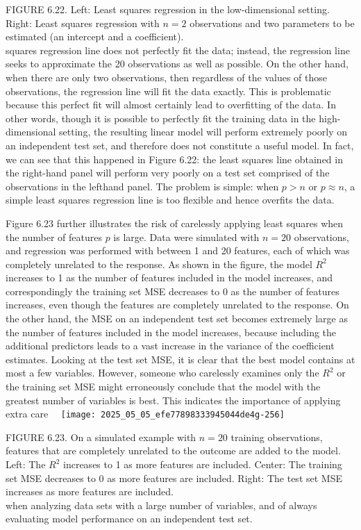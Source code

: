 \documentclass[10pt]{article}
\begin{document}
FIGURE 6.22. Left: Least squares regression in the low-dimensional setting. Right: Least squares regression with $n=2$ observations and two parameters to be estimated (an intercept and a coefficient).\\
squares regression line does not perfectly fit the data; instead, the regression line seeks to approximate the 20 observations as well as possible. On the other hand, when there are only two observations, then regardless of the values of those observations, the regression line will fit the data exactly. This is problematic because this perfect fit will almost certainly lead to overfitting of the data. In other words, though it is possible to perfectly fit the training data in the high-dimensional setting, the resulting linear model will perform extremely poorly on an independent test set, and therefore does not constitute a useful model. In fact, we can see that this happened in Figure 6.22: the least squares line obtained in the right-hand panel will perform very poorly on a test set comprised of the observations in the lefthand panel. The problem is simple: when $p>n$ or $p \approx n$, a simple least squares regression line is too flexible and hence overfits the data.

Figure 6.23 further illustrates the risk of carelessly applying least squares when the number of features $p$ is large. Data were simulated with $n=20$ observations, and regression was performed with between 1 and 20 features, each of which was completely unrelated to the response. As shown in the figure, the model $R^{2}$ increases to 1 as the number of features included in the model increases, and correspondingly the training set MSE decreases to 0 as the number of features increases, even though the features are completely unrelated to the response. On the other hand, the MSE on an independent test set becomes extremely large as the number of features included in the model increases, because including the additional predictors leads to a vast increase in the variance of the coefficient estimates. Looking at the test set MSE, it is clear that the best model contains at most a few variables. However, someone who carelessly examines only the $R^{2}$ or the training set MSE might erroneously conclude that the model with the greatest number of variables is best. This indicates the importance of applying extra care\
\
\texttt{[image: 2025\_05\_05\_efe77898333945044de4g-256]}

FIGURE 6.23. On a simulated example with $n=20$ training observations, features that are completely unrelated to the outcome are added to the model. Left: The $R^{2}$ increases to 1 as more features are included. Center: The training set MSE decreases to 0 as more features are included. Right: The test set MSE increases as more features are included.\\
when analyzing data sets with a large number of variables, and of always evaluating model performance on an independent test set.
\end{document}
